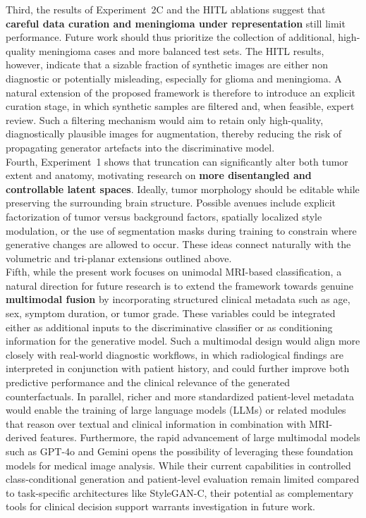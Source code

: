 Third, the results of Experiment~2C and the HITL ablations suggest that \textbf{careful data curation and meningioma under representation} still limit performance. Future work should thus prioritize the collection of additional, high-quality meningioma cases and more balanced test sets. The HITL results, however, indicate that a sizable fraction of synthetic images are either non diagnostic or potentially misleading, especially for glioma and meningioma. A natural extension of the proposed framework is therefore to introduce an explicit curation stage, in which synthetic samples are filtered and, when feasible, expert review. Such a filtering mechanism would aim to retain only high-quality, diagnostically plausible images for augmentation, thereby reducing the risk of propagating generator artefacts into the discriminative model.\\


Fourth, Experiment~1 shows that truncation can significantly alter both tumor extent and anatomy, motivating research on \textbf{more disentangled and controllable latent spaces}. Ideally, tumor morphology should be editable while preserving the surrounding brain structure. Possible avenues include explicit factorization of tumor versus background factors, spatially localized style modulation, or the use of segmentation masks during training to constrain where generative changes are allowed to occur. These ideas connect naturally with the volumetric and tri-planar extensions outlined above.\\


Fifth, while the present work focuses on unimodal MRI-based classification, a natural direction for future research is to extend the framework towards genuine \textbf{multimodal fusion} by incorporating structured clinical metadata such as age, sex, symptom duration, or tumor grade. These variables could be integrated either as additional inputs to the discriminative classifier or as conditioning information for the generative model. Such a multimodal design would align more closely with real-world diagnostic workflows, in which radiological findings are interpreted in conjunction with patient history, and could further improve both predictive performance and the clinical relevance of the generated counterfactuals. In parallel, richer and more standardized patient-level metadata would enable the training of large language models (LLMs) or related modules that reason over textual and clinical information in combination with MRI-derived features. Furthermore, the rapid advancement of large multimodal models such as GPT-4o and Gemini opens the possibility of leveraging these foundation models for medical image analysis. While their current capabilities in controlled class-conditional generation and patient-level evaluation remain limited compared to task-specific architectures like StyleGAN-C, their potential as complementary tools for clinical decision support warrants investigation in future work.\\

